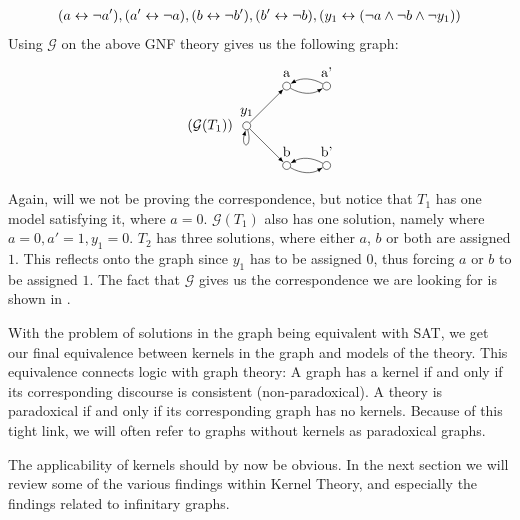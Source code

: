 \begin{example}
  \begin{align}
    ( a \leftrightarrow \neg a'), (a' \leftrightarrow \neg a), (b \leftrightarrow \neg b'), (b' \leftrightarrow \neg b), (y_1 \leftrightarrow (\neg a \wedge \neg b \wedge \neg y_1))
  \end{align}
  Using $\mathcal{G}$ on the above GNF theory gives us the following graph:
  \[
    \begin{tikzpicture}
      [
      point/.style={circle,draw,inner sep=0pt,minimum size=2mm},
      collection/.style={thick,rectangle,draw,inner sep=0pt,minimum height=14mm, minimum width= 9mm}
      ]
      \node (label) at (5,1) [label=left:$(\mathcal{G}(T_1))\;$] {};
      \node (0) at (5,1) [point,label=above:$y_1$] {};
      \node (1) at (6,0) [point,label=above:b] {};
      \node (2) at (7,0) [point,label=above:b'] {};
      \node (3) at (6,2) [point,label=above:a] {};
      \node (4) at (7,2) [point,label=above:a'] {};
      \draw [-latex, loop below] (0) to (0);
      \draw [-latex] (0) to (1);
      \draw [-latex, bend right] (1) to (2);
      \draw [-latex, bend right] (2) to (1);
      \draw [-latex] (0) to (3);
      \draw [-latex, bend right] (3) to (4);
      \draw [-latex, bend right] (4) to (3);
    \end{tikzpicture}
  \]
\end{example}
Again, will we not be proving the correspondence, but notice that $T_1$ has one model satisfying it, where $a = 0$.
$\mathcal{G}(T_1)$ also has one solution, namely where $a = 0, a' = 1, y_1 = 0$.
$T_2$ has three solutions, where either $a$, $b$ or both are assigned $1$.
This reflects onto the graph since $y_1$ has to be assigned $0$, thus forcing $a$ or $b$ to be assigned $1$.
The fact that $\mathcal{G}$ gives us the correspondence we are looking for is shown in \cite{apal-digraph}.

With the problem of solutions in the graph being equivalent with SAT, we get our final equivalence between kernels in the graph and models of the theory.
This equivalence connects logic with graph theory:
A graph has a kernel if and only if its corresponding discourse is consistent (non-paradoxical).
A theory is paradoxical if and only if its corresponding graph has no kernels.
Because of this tight link, we will often refer to graphs without kernels as paradoxical graphs.

The applicability of kernels should by now be obvious.
In the next section we will review some of the various findings within Kernel Theory, and especially the findings related to infinitary graphs.
